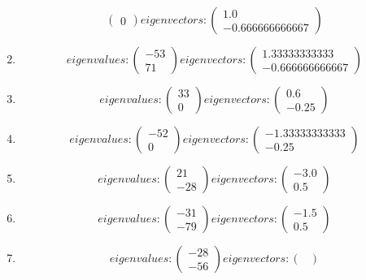 \documentclass{article}%
\begin{document}
\begin{enumerate}[label=\arabic*)]
\[\begin{pmatrix}
0%
\end{pmatrix} eigenvectors: \begin{pmatrix}%
1.0\\%
-0.666666666667%
\end{pmatrix}%
\]%
\item%
\[%
eigenvalues: \begin{pmatrix}%
-53\\%
71%
\end{pmatrix} eigenvectors: \begin{pmatrix}%
1.33333333333\\%
-0.666666666667%
\end{pmatrix}%
\]%
\item%
\[%
eigenvalues: \begin{pmatrix}%
33\\%
0%
\end{pmatrix} eigenvectors: \begin{pmatrix}%
0.6\\%
-0.25%
\end{pmatrix}%
\]%
\item%
\[%
eigenvalues: \begin{pmatrix}%
-52\\%
0%
\end{pmatrix} eigenvectors: \begin{pmatrix}%
-1.33333333333\\%
-0.25%
\end{pmatrix}%
\]%
\item%
\[%
eigenvalues: \begin{pmatrix}%
21\\%
-28%
\end{pmatrix} eigenvectors: \begin{pmatrix}%
-3.0\\%
0.5%
\end{pmatrix}%
\]%
\item%
\[%
eigenvalues: \begin{pmatrix}%
-31\\%
-79%
\end{pmatrix} eigenvectors: \begin{pmatrix}%
-1.5\\%
0.5%
\end{pmatrix}%
\]%
\item%
\[%
eigenvalues: \begin{pmatrix}%
-28\\%
-56%
\end{pmatrix} eigenvectors: \begin{pmatrix}%

\end{pmatrix}\]
\end{enumerate}
\end{document}
